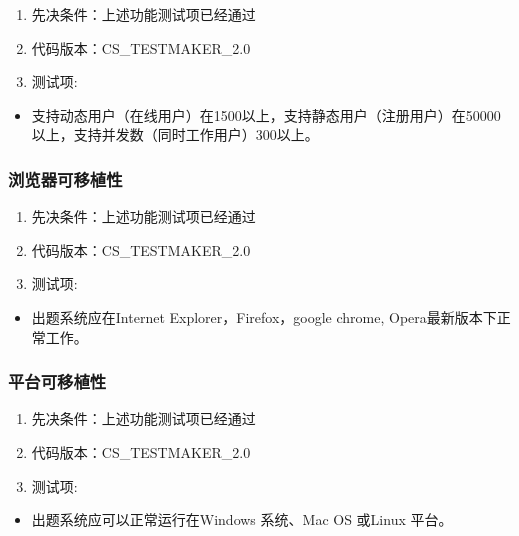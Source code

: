 \documentclass[hyperref, a4paper]{ctexart}
\providecommand{\tightlist}{%
  \setlength{\itemsep}{0pt}\setlength{\parskip}{0pt}}
\begin{document}
\begin{enumerate}
\def\labelenumi{\arabic{enumi}.}
\tightlist
\item
  先决条件：上述功能测试项已经通过
\item
  代码版本：CS\_TESTMAKER\_2.0
\item
  测试项:
\end{enumerate}

\begin{itemize}
\tightlist
\item
  支持动态用户（在线用户）在1500以上，支持静态用户（注册用户）在50000以上，支持并发数（同时工作用户）300以上。
\end{itemize}

\hypertarget{ux6d4fux89c8ux5668ux53efux79fbux690dux6027}{%
\subsubsection{浏览器可移植性}\label{ux6d4fux89c8ux5668ux53efux79fbux690dux6027}}

\begin{enumerate}
\def\labelenumi{\arabic{enumi}.}
\tightlist
\item
  先决条件：上述功能测试项已经通过
\item
  代码版本：CS\_TESTMAKER\_2.0
\item
  测试项:
\end{enumerate}

\begin{itemize}
\tightlist
\item
  出题系统应在Internet Explorer，Firefox，google chrome,
  Opera最新版本下正常工作。
\end{itemize}

\hypertarget{ux5e73ux53f0ux53efux79fbux690dux6027}{%
\subsubsection{平台可移植性}\label{ux5e73ux53f0ux53efux79fbux690dux6027}}

\begin{enumerate}
\def\labelenumi{\arabic{enumi}.}
\tightlist
\item
  先决条件：上述功能测试项已经通过
\item
  代码版本：CS\_TESTMAKER\_2.0
\item
  测试项:
\end{enumerate}

\begin{itemize}
\tightlist
\item
  出题系统应可以正常运行在Windows 系统、Mac OS 或Linux 平台。
\end{itemize}
\end{document}
